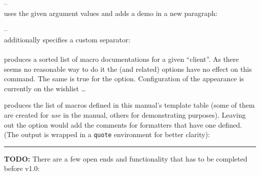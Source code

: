 \documentclass[12pt]{scrartcl}
\begin{document}

\medskip
\noindent \texttt{} --\\
uses the given argument values and adds a demo in a new paragraph:


\medskip
\noindent \texttt{} --\\
additionally specifies a custom separator:



\paragraph{\texttt{}}

produces a sorted list of macro documentations for a given “client”.  As there seems no reasonable way to do it the  (and related) options have no effect on this command.  The same is true for the  option.
Configuration of the appearance is currently on the wishlist \dots

\medskip

\noindent \texttt{} produces the
list of macros defined in this manual's template table (some of them are created
for \emph{use} in the manual, others for demonstrating purposes).  Leaving out
the  option would add the comments for formatters that have
one defined. (The output is wrapped in a \texttt{quote} environment for better clarity):

\begin{quote}
\end{quote}

\bigskip

\hrule

\bigskip

\noindent \textbf{TODO:} There are a few open ends and functionality that has to be completed before v1.0:
\end{document}
